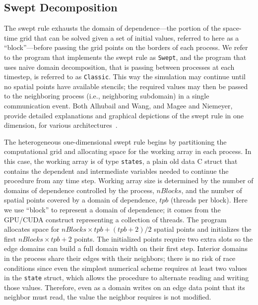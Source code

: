 \subsection{Swept Decomposition} \label{sec:hSweptDecomp}

The swept rule exhausts the domain of dependence---the portion of the space-time grid that can be solved given a set of initial values, referred to here as a ``block''---before passing the grid points on the borders of each process.
We refer to the program that implements the swept rule as \texttt{Swept}, and the program that uses naive domain decomposition, that is passing between processes at each timestep, is referred to as \texttt{Classic}.
This way the simulation may continue until no spatial points have available stencils; the required values may then be passed to the neighboring process (i.e., neighboring subdomain) in a single communication event.
Both Alhubail and Wang, and Magee and Niemeyer, provide detailed explanations and graphical depictions
of the swept rule in one dimension, for various architectures~\cite{alhubail:16jcp, OurJCP}.

The heterogeneous one-dimensional swept rule begins by partitioning the computational grid and
allocating space for the working array in each process.
In this case, the working array is of type \texttt{states}, a plain old data C struct that contains the
dependent and intermediate variables needed to continue the procedure from any time step.
Working array size is determined by the number of domains of dependence controlled by the process,
$nBlocks$, and the number of spatial points covered by a domain of dependence, $tpb$ (threads per block).
Here we use ``block'' to represent a domain of dependence; it comes from the GPU\slash CUDA
construct representing a collection of threads.
The program allocates space for $nBlocks \times tpb + (tpb+2)/2$ spatial points and initializes the
first $nBlocks \times tpb + 2$ points.
The initialized points require two extra slots so the edge domains
can build a full domain width on their first step.
Interior domains in the process share their edges with their neighbors; there is no risk of
race conditions since even the simplest numerical scheme requires at least two values in the
\texttt{state} struct, which allows the procedure to alternate reading and writing those values.
Therefore, even as a domain writes on an edge data point that its neighbor must read,
the value the neighbor requires is not modified.

